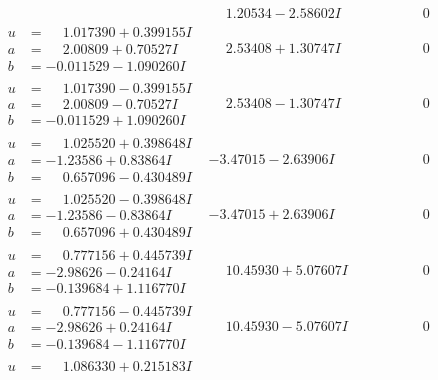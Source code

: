 \documentclass[1p]{elsarticle_modified}
\theoremstyle{definition}
\begin{document}
$$\begin{array}{c|c|c}
 & \phantom{-}1.20534 - 2.58602 I & \phantom{-0.000000 } 0 \\ \hline\begin{aligned}
u &= \phantom{-}1.017390 + 0.399155 I \\
a &= \phantom{-}2.00809 + 0.70527 I \\
b &= -0.011529 - 1.090260 I\end{aligned}
 & \phantom{-}2.53408 + 1.30747 I & \phantom{-0.000000 } 0 \\ \hline\begin{aligned}
u &= \phantom{-}1.017390 - 0.399155 I \\
a &= \phantom{-}2.00809 - 0.70527 I \\
b &= -0.011529 + 1.090260 I\end{aligned}
 & \phantom{-}2.53408 - 1.30747 I & \phantom{-0.000000 } 0 \\ \hline\begin{aligned}
u &= \phantom{-}1.025520 + 0.398648 I \\
a &= -1.23586 + 0.83864 I \\
b &= \phantom{-}0.657096 - 0.430489 I\end{aligned}
 & -3.47015 - 2.63906 I & \phantom{-0.000000 } 0 \\ \hline\begin{aligned}
u &= \phantom{-}1.025520 - 0.398648 I \\
a &= -1.23586 - 0.83864 I \\
b &= \phantom{-}0.657096 + 0.430489 I\end{aligned}
 & -3.47015 + 2.63906 I & \phantom{-0.000000 } 0 \\ \hline\begin{aligned}
u &= \phantom{-}0.777156 + 0.445739 I \\
a &= -2.98626 - 0.24164 I \\
b &= -0.139684 + 1.116770 I\end{aligned}
 & \phantom{-}10.45930 + 5.07607 I & \phantom{-0.000000 } 0 \\ \hline\begin{aligned}
u &= \phantom{-}0.777156 - 0.445739 I \\
a &= -2.98626 + 0.24164 I \\
b &= -0.139684 - 1.116770 I\end{aligned}
 & \phantom{-}10.45930 - 5.07607 I & \phantom{-0.000000 } 0 \\ \hline\begin{aligned}
u &= \phantom{-}1.086330 + 0.215183 I \\

\end{aligned}
\end{array}$$
\end{document}
